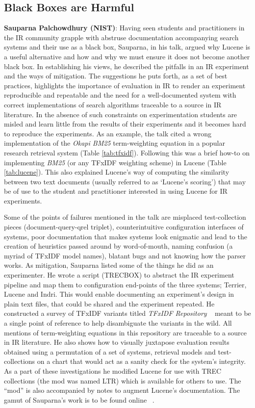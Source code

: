 \subsection*{Black Boxes are Harmful}

{\bf Sauparna Palchowdhury (NIST)}: Having seen students and
practitioners in the IR community grapple with abstruse documentation
accompanying search systems and their use as a black box, Sauparna, in
his talk, argued why Lucene is a useful alternative and how and why we
must ensure it does not become another black box. In establishing his
views, he described the pitfalls in an IR experiment and the ways of
mitigation. The suggestions he puts forth, as a set of best practices,
highlights the importance of evaluation in IR to render an experiment
reproducible and repeatable and the need for a well-documented system
with correct implementations of search algorithms traceable to a
source in IR literature. In the absence of such constraints on
experimentation students are misled and learn little from the results
of their experiments and it becomes hard to reproduce the
experiments. As an example, the talk cited a wrong implementation of
the \emph{Okapi BM25} term-weighting equation in a popular research
retrieval system (Table \ref{tab:tfxidf}). Following this was a brief
how-to on implementing \emph{BM25} (or any TFxIDF weighting scheme) in
Lucene (Table \ref{tab:lucene}). This also explained Lucene's way of
computing the similarity between two text documents (usually referred
to as `Lucene's scoring') that may be of use to the student and
practitioner interested in using Lucene for IR experiments.

Some of the points of failures mentioned in the talk are misplaced
test-collection pieces (document-query-qrel triplet), counterintuitive
configuration interfaces of systems, poor documentation that makes
systems look enigmatic and lead to the creation of heuristics passed
around by word-of-mouth, naming confusion (a myriad of TFxIDF model
names), blatant bugs and not knowing how the parser works. As
mitigation, Sauparna listed some of the things he did as an
experimenter. He wrote a script (TRECBOX) to abstract the IR
experiment pipeline and map them to configuration end-points of the
three systems; Terrier, Lucene and Indri. This would enable
documenting an experiment's design in plain text files, that could be
shared and the experiment repeated. He constructed a survey of TFxIDF
variants titled \emph{TFxIDF Repository} ~\cite{rup:TFXIDFRepository}
meant to be a single point of reference to help disambiguate the
variants in the wild. All mentions of term-weighting equations in this
repository are traceable to a source in IR literature. He also shows
how to visually juxtapose evaluation results obtained using a
permutation of a set of systems, retrieval models and test-collections
on a chart that would act as a sanity check for the system's
integrity. As a part of these investigations he modified Lucene for
use with TREC collections (the mod was named LTR) which is available
for others to use. The ``mod'' is also accompanied by notes to augment
Lucene's documentation. The gamut of Sauparna's work is to be found
online ~\cite{rup:IR}.

